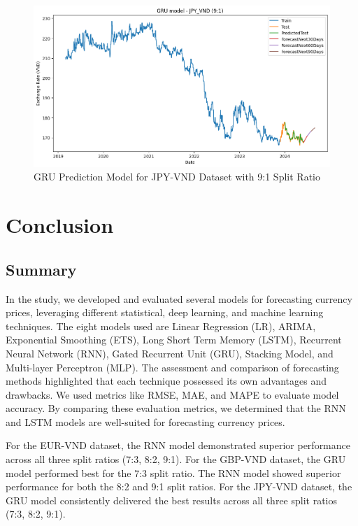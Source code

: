 \documentclass{ieeeojies}
\begin{document}
\begin{figure}[H]
  \centering
  \begin{minipage}{0.8\linewidth}
    \centering
    \includegraphics[width=\linewidth]{GRU/GRU_jpy_91.png}
    \caption{GRU Prediction Model for JPY-VND Dataset with 9:1 Split Ratio}
    \label{fig33}
  \end{minipage}
\end{figure}

\section{Conclusion}
\subsection{Summary}

In the study, we developed and evaluated several models for forecasting currency prices, leveraging different statistical, deep learning, and machine learning techniques. The eight models used are Linear Regression (LR), ARIMA, Exponential Smoothing (ETS), Long Short Term Memory (LSTM), Recurrent Neural Network (RNN), Gated Recurrent Unit (GRU), Stacking Model, and Multi-layer Perceptron (MLP). The assessment and comparison of forecasting methods highlighted that each technique possessed its own advantages and drawbacks. We used metrics like RMSE, MAE, and MAPE to evaluate model accuracy. By comparing these evaluation metrics, we determined that the RNN and LSTM models are well-suited for forecasting currency prices. 

For the EUR-VND dataset, the RNN model demonstrated superior performance across all three split ratios (7:3, 8:2, 9:1). For the GBP-VND dataset, the GRU model performed best for the 7:3 split ratio. The RNN model showed superior performance for both the 8:2 and 9:1 split ratios. For the JPY-VND dataset, the GRU model consistently delivered the best results across all three split ratios (7:3, 8:2, 9:1).
\end{document}

